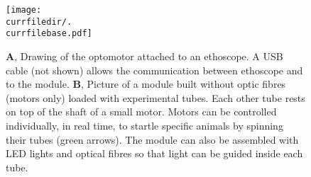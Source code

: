 \begin{figure}[h!]
  \centering   
   \texttt{[image: \\currfiledir/.\\currfilebase.pdf]}
  \caption[The optomotor]{
  	\textbf{A}, Drawing of the optomotor attached to an ethoscope. 
  	A USB cable (not shown) allows the communication between ethoscope and to the module.
  	\textbf{B}, Picture of a module built without optic fibres (motors only) loaded with experimental tubes. 
  	Each other tube rests on top of the shaft of a small motor.
  	Motors can be controlled individually, in real time, to startle specific animals  by spinning their tubes (green arrows).
	The module can also be assembled with LED lights and optical fibres so that light can be guided inside each tube.
  \label{fig:\currfilebase}
  }
\end{figure}





